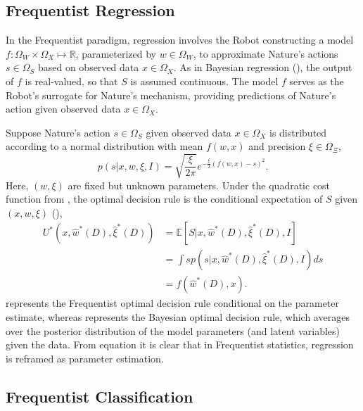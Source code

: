 \subsection{Frequentist Regression}
\label{chp:frequentist_regression}
In the Frequentist paradigm, regression involves the Robot constructing a model $f: \Omega_W \times \Omega_X \mapsto \mathbb{R}$, parameterized by $w \in \Omega_W$, to approximate Nature's actions $s\in \Omega_S$ based on observed data $x\in \Omega_X$. As in Bayesian regression (), the output of $f$ is real-valued, so that $S$ is assumed continuous. The model $f$ serves as the Robot's surrogate for Nature's mechanism, providing predictions of Nature's action given observed data $x \in \Omega_X$. \newline

Suppose Nature's action $s\in\Omega_S$ given observed data $x\in \Omega_X$ is distributed according to a normal distribution with mean $f(w,x)$ and precision $\xi \in \Omega_{\Xi}$,
\begin{equation}
	p(s | x, w, \xi, I) 
	= \sqrt{\frac{\xi}{2\pi}} e^{-\frac{\xi}{2}(f(w,x)-s)^2}.
	\label{freq:dist}
\end{equation}
Here, $(w,\xi)$ are fixed but unknown parameters. Under the quadratic cost function from , the optimal decision rule is the conditional expectation of $S$ given $(x,w,\xi)$ (),
\begin{equation}
	\begin{split}
		U^*(x,\hat{w}^*(D),\hat{\xi}^*(D)) &= \mathbb{E}[S | x, \hat{w}^*(D), \hat{\xi}^*(D), I]\\
		&= \int s p(s | x, \hat{w}^*(D), \hat{\xi}^*(D), I) ds\\
		& = f(\hat{w}^*(D),x).
	\end{split}
	\label{freq:decision}
\end{equation}
 represents the Frequentist optimal decision rule conditional on the parameter estimate, whereas  represents the Bayesian optimal decision rule, which averages over the posterior distribution of the model parameters (and latent variables) given the data. From equation  it is clear that in Frequentist statistics, regression is reframed as parameter estimation.


\subsection{Frequentist Classification}
\label{chp:frequentist_classification}

